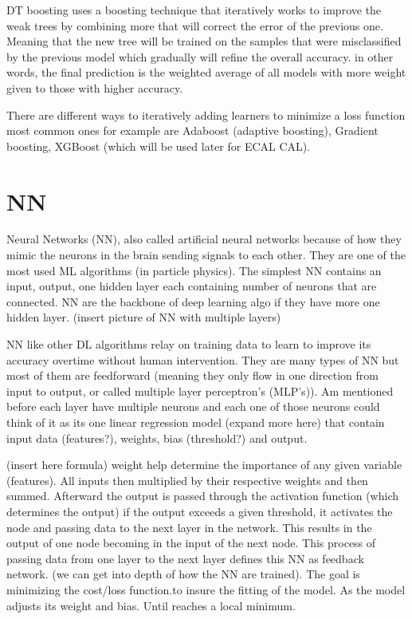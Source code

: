 DT boosting uses a boosting technique that iteratively works to improve the weak trees by combining more that will correct the error of the previous one.
Meaning that the new tree will be trained on the samples that were misclassified by the previous model which gradually will refine the overall accuracy.
in other words, the final prediction is the weighted average of all models with more weight given to those with higher accuracy.

There are different ways to iteratively adding learners to minimize a loss function most common ones for example are Adaboost (adaptive boosting), Gradient boosting, XGBoost (which will be used later for ECAL CAL).

\section{NN} 

Neural Networks (NN), also called artificial neural networks because of how they mimic the neurons in the brain sending signals to each other.
They are one of the most used ML algorithms (in particle physics).
The simplest NN contains an input, output, one hidden layer each containing number of neurons that are connected. NN are the backbone of deep learning algo if they have more one hidden layer. (insert picture of NN with multiple layers) 

NN like other DL algorithms relay on training data to learn to improve its accuracy overtime without human intervention.
They are many types of NN but most of them are feedforward (meaning they only flow in one direction from input to output, or called multiple layer perceptron's (MLP’s)).
Am mentioned before each layer have multiple neurons and each one of those neurons could think of it as its one linear regression model (expand more here) that contain input data (features?), weights, bias (threshold?) and output.

(insert here formula) weight help determine the importance of any given variable (features).
All inputs then multiplied by their respective weights and then summed.
Afterward the output is passed through the activation function (which determines the output) if the output exceeds a given threshold, it activates the node and passing data to the next layer in the network.
This results in the output of one node becoming in the input of the next node.
This process of passing data from one layer to the next layer defines this NN as feedback network.
(we can get into depth of how the NN are trained).
The goal is minimizing the cost/loss function.to insure the fitting of the model. As the model adjusts its weight and bias. Until reaches a local minimum. 






